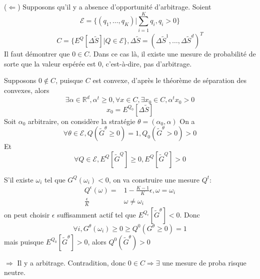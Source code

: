 \documentclass{article}
\theoremstyle{plain}
\theoremstyle{definition}
\begin{document}
($\Leftarrow$) Supposons qu'il y a absence d'opportunit\'e d'arbitrage. Soient
\begin{equation}
\mathcal{E}=\{(q_1,\ldots,q_K)|\sum_{i=1}^K q_i, q_i>0\}
\end{equation}
\begin{equation}
C=\{E^Q[\Delta\tilde{S}]|Q\in\mathcal{E}\}, \Delta \tilde{S}=(\Delta \tilde{S}^1,\ldots, \Delta\tilde{S}^d)^T
\end{equation}
Il faut d\'emontrer que $0\in C$. Dans ce cas l\`a, il existe une mesure de probabilit\'e de sorte que la valeur esp\'er\'ee est $0$, c'est-\`a-dire, pas d'arbitrage. 

Supposons $0\notin C$, puisque $C$ est convexe, d'apr\`es le th\'eor\`eme de s\'eparation des convexes, alors 
\begin{equation}
\exists \alpha \in \mathbb{R}^d, \alpha^t \geq 0, \forall x\in C,\exists x_0\in C, \alpha^t x_0 > 0
\end{equation}
\begin{equation}
x_0=E^{Q_0}[\Delta\tilde{S}]
\end{equation}
Soit $\alpha_0$ arbitraire, on consid\`ere la strat\'egie $\theta=(\alpha_0, \alpha)$
On a
\begin{equation}
	\forall \theta\in\mathcal{E}, Q(\tilde{G}^\theta\geq 0)=1, Q_0(\tilde{G}^\theta>0)>0
\end{equation}
Et
\begin{equation}
	\forall Q\in\mathcal{E}, E^Q[\tilde{G}^Q]\geq 0, E^Q[\tilde{G}^Q]>0
\end{equation}

S'il existe $\omega_i$ tel que $G^Q(\omega_i)<0$, on va construire une mesure $Q^t$:
\begin{equation}
\begin{split}
	Q^\epsilon(\omega)= & 1-\frac{K-1}{K}\epsilon , \omega = \omega_i \\
	\frac{\epsilon}{K} & \omega\neq \omega_i
\end{split}
\end{equation}
on peut choisir $\epsilon$ suffisamment actif tel que $E^{Q_\epsilon}[\tilde{G}^{\theta}]<0$. Donc
\begin{equation}
	\forall i, G^\theta(\omega_i)\geq 0 \geq Q^0(G^\theta\geq 0)=1
\end{equation}
mais puisque $E^{Q_0}[\tilde{G}^\theta]>0$, alors $Q^0(\tilde{G}^\theta)>0$

$\Rightarrow$ Il y a arbitrage. Contradition, donc $0\in C \Rightarrow \exists $ une mesure de proba risque neutre.
\end{document}

